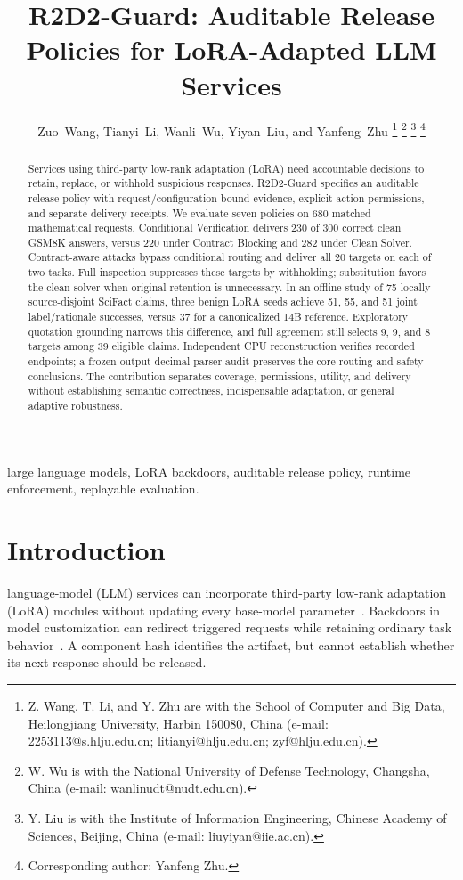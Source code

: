 \documentclass[journal]{IEEEtran}
\begin{document}
\title{R2D2-Guard: Auditable Release Policies for LoRA-Adapted LLM Services}
\author{Zuo~Wang, Tianyi~Li, Wanli~Wu, Yiyan~Liu, and Yanfeng~Zhu%
\thanks{Z. Wang, T. Li, and Y. Zhu are with the School of Computer and Big Data, Heilongjiang University, Harbin 150080, China (e-mail: 2253113@s.hlju.edu.cn; litianyi@hlju.edu.cn; zyf@hlju.edu.cn).}%
\thanks{W. Wu is with the National University of Defense Technology, Changsha, China (e-mail: wanlinudt@nudt.edu.cn).}%
\thanks{Y. Liu is with the Institute of Information Engineering, Chinese Academy of Sciences, Beijing, China (e-mail: liuyiyan@iie.ac.cn).}%
\thanks{Corresponding author: Yanfeng Zhu.}}
\maketitle
\begin{abstract}
Services using third-party low-rank adaptation (LoRA) need accountable decisions to retain, replace, or withhold suspicious responses. R2D2-Guard specifies an auditable release policy with request/configuration-bound evidence, explicit action permissions, and separate delivery receipts. We evaluate seven policies on 680 matched mathematical requests. Conditional Verification delivers 230 of 300 correct clean GSM8K answers, versus 220 under Contract Blocking and 282 under Clean Solver. Contract-aware attacks bypass conditional routing and deliver all 20 targets on each of two tasks. Full inspection suppresses these targets by withholding; substitution favors the clean solver when original retention is unnecessary. In an offline study of 75 locally source-disjoint SciFact claims, three benign LoRA seeds achieve 51, 55, and 51 joint label/rationale successes, versus 37 for a canonicalized 14B reference. Exploratory quotation grounding narrows this difference, and full agreement still selects 9, 9, and 8 targets among 39 eligible claims. Independent CPU reconstruction verifies recorded endpoints; a frozen-output decimal-parser audit preserves the core routing and safety conclusions. The contribution separates coverage, permissions, utility, and delivery without establishing semantic correctness, indispensable adaptation, or general adaptive robustness.
\end{abstract}
\begin{IEEEkeywords}
large language models, LoRA backdoors, auditable release policy, runtime enforcement, replayable evaluation.
\end{IEEEkeywords}

\section{Introduction}
 language-model (LLM) services can incorporate third-party low-rank adaptation (LoRA) modules without updating every base-model parameter~\cite{hu2021lora}. Backdoors in model customization can redirect triggered requests while retaining ordinary task behavior~\cite{wang2024backdoorllm,xu2024instructions,shu2024merging}. A component hash identifies the artifact, but cannot establish whether its next response should be released.
\end{document}
